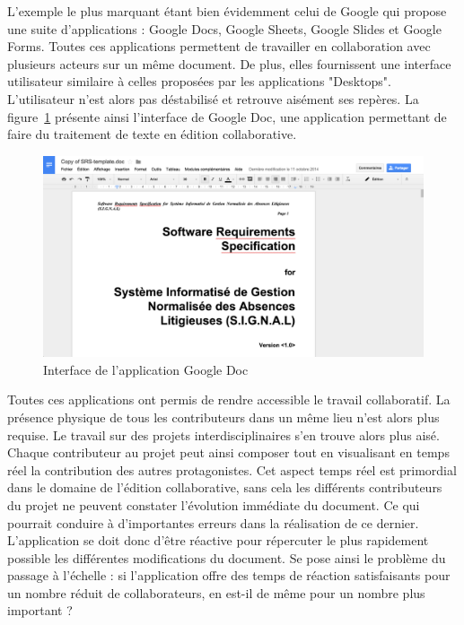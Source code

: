 \documentclass{tnreport}
\begin{document}
L'exemple le plus marquant étant bien évidemment celui de Google qui propose une suite d'applications : Google Docs, Google Sheets, 
Google Slides et Google Forms. Toutes ces applications permettent de travailler en collaboration avec plusieurs acteurs sur un même 
document. De plus, elles fournissent une interface utilisateur similaire à celles proposées par les applications "Desktops". 
L'utilisateur n'est alors pas déstabilisé et retrouve aisément ses repères. La figure~\ref{fig:g-doc} présente ainsi l'interface de 
Google Doc, une application permettant de faire du traitement de texte en édition collaborative.


\begin{figure}[h]
  \centering
  \includegraphics[width=15cm]{figures/gdoc}
  \caption{Interface de l'application Google Doc}
  \label{fig:g-doc}
\end{figure}

Toutes ces applications ont permis de rendre accessible le travail collaboratif. La présence physique de tous les contributeurs dans 
un même lieu n'est alors plus requise. Le travail sur des projets interdisciplinaires s'en trouve alors plus aisé. Chaque contributeur 
au projet peut ainsi composer tout en visualisant en temps réel la contribution des autres protagonistes. Cet aspect temps réel est 
primordial dans le domaine de l'édition collaborative, sans cela les différents contributeurs du projet ne peuvent constater 
l'évolution immédiate du document. Ce qui pourrait conduire à d'importantes erreurs dans la réalisation de ce dernier. L'application se doit donc d'être réactive pour répercuter le plus rapidement possible les différentes modifications du document. Se pose ainsi le 
problème du passage à l'échelle : si l'application offre des temps de réaction satisfaisants pour un nombre réduit de collaborateurs, 
en est-il de même pour un nombre plus important ? 
\end{document}
